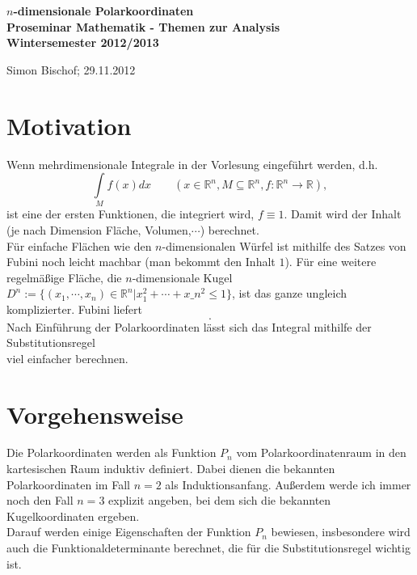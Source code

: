 \documentclass[a4paper,11pt]{report}
\theoremstyle{definition}
\newcommand{\R}{{\ensuremath{\mathbb{R}}}}
\newcommand{\const}{\ensuremath{\equiv}}
\begin{document}
\begin{titlepage}
	\begin{center}	
		\LARGE \textbf{$n$-dimensionale Polarkoordinaten \\[5ex]
			{\Large Proseminar Mathematik - Themen zur Analysis \\[5ex] 
    		Wintersemester 2012/2013}\\[5ex]}
	\end{center}
	\begin{center}
		Simon Bischof; 29.11.2012 %
	\end{center}
\end{titlepage}
\clearpage{}
\setcounter{tocdepth}{1}
\tableofcontents

\clearpage{}
\chapter{Motivation}
Wenn mehrdimensionale Integrale in der Vorlesung eingeführt werden, d.h.
$$\int\limits_M f(x)dx \qquad (x\in\R^n,M\subseteq \R^n, f:\R^n\to\R),$$ %
ist eine der ersten Funktionen, die integriert wird, $f\const 1$. Damit wird der Inhalt (je nach Dimension Fläche, Volumen,$\cdots$) berechnet.\\
Für einfache Flächen wie den $n$-dimensionalen Würfel %
ist mithilfe des Satzes von Fubini noch leicht machbar (man bekommt den Inhalt $1$). Für eine weitere regelmäßige Fläche, die $n$-dimensionale Kugel $D^n:=\{(x_1,\cdots,x_n)\in\R^n|x_1^2+\cdots+x\_n^2\leq 1\}$, ist das ganze ungleich komplizierter. Fubini liefert
$$.$$%
Nach Einführung der Polarkoordinaten lässt sich das Integral mithilfe der Substitutionsregel
$$$$%
viel einfacher berechnen.
\chapter{Vorgehensweise}
Die Polarkoordinaten werden als Funktion $P_n$ vom \glqq Polarkoordinatenraum\grqq{} in den kartesischen Raum induktiv definiert. Dabei dienen die bekannten Polarkoordinaten im Fall $n=2$ als Induktionsanfang. Außerdem werde ich immer noch den Fall $n=3$ explizit angeben, bei dem sich die bekannten Kugelkoordinaten ergeben.\\
Darauf werden einige Eigenschaften der Funktion $P_n$ bewiesen, insbesondere wird auch die Funktionaldeterminante berechnet, die für die Substitutionsregel %
wichtig ist.
\end{document}
